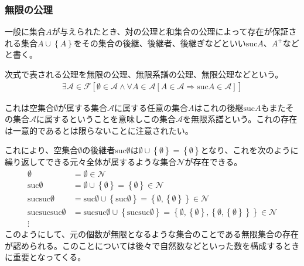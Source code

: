 \documentclass[a4paper]{jsarticle}
\begin{document}
\subsubsection{無限の公理}%
\begin{dfn}
一般に集合$A$が与えられたとき、対の公理と和集合の公理によって存在が保証される集合$A \cup \left\{ A \right\}$をその集合の後継、後継者、後継ぎなどといい$\mathrm{suc}A$、$A^{+}$などと書く。
\end{dfn}
\begin{axs}
次式で表される公理を無限の公理、無限系譜の公理、無限公理などという。
\begin{align*}
\mathcal{\exists A \in F}\left[ \mathcal{\emptyset \in A \land \forall}A \in \mathcal{A}\left[ A \in \mathcal{A \Rightarrow}\mathrm{suc}A\in \mathcal{A} \right] \right]
\end{align*}
\end{axs}
これは空集合$\emptyset$が属する集合$\mathcal{A}$に属する任意の集合$A$はこれの後継$\mathrm{suc}A$もまたその集合$\mathcal{A}$に属するということを意味しこの集合$\mathcal{A}$を無限系譜という。これの存在は一意的であるとは限らないことに注意されたい。\par
これにより、空集合$\emptyset$の後継者$\mathrm{suc}\emptyset$は$\emptyset \cup \left\{ \emptyset \right\} = \left\{ \emptyset \right\}$となり、これを次のように繰り返してできる元々全体が属するような集合$\mathcal{N}$が存在できる。
\begin{align*}
\emptyset &= \emptyset\in \mathcal{N}\\
\mathrm{suc}\emptyset &= \emptyset \cup \left\{ \emptyset \right\} = \left\{ \emptyset \right\}\in \mathcal{N}\\
\mathrm{suc}{\mathrm{suc}\emptyset} &= \mathrm{suc}\emptyset \cup \left\{ \mathrm{suc}\emptyset \right\} = \left\{ \emptyset,\left\{ \emptyset \right\} \right\}\in \mathcal{N}\\
\mathrm{suc}{\mathrm{suc}{\mathrm{suc}\emptyset}} &= \mathrm{suc}{\mathrm{suc}\emptyset} \cup \left\{ \mathrm{suc}{\mathrm{suc}\emptyset} \right\} = \left\{ \emptyset,\left\{ \emptyset \right\},\left\{ \emptyset,\left\{ \emptyset \right\} \right\} \right\}\in \mathcal{N} \\
\vdots
\end{align*}
このようにして、元の個数が無限となるような集合のことである無限集合の存在が認められる。このことについては後々で自然数などといった数を構成するときに重要となってくる。
\end{document}
